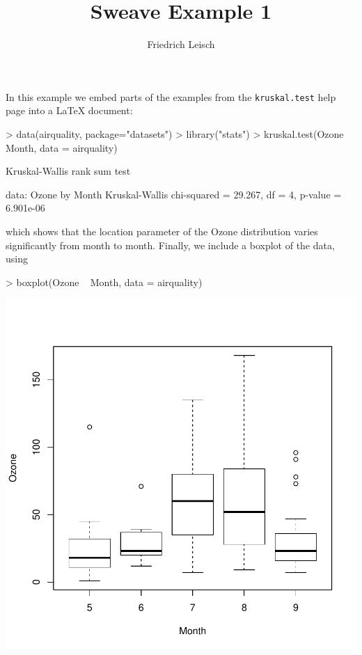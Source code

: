 \documentclass[a4paper]{article}
\title{Sweave Example 1}
\author{Friedrich Leisch}
\begin{document}
\maketitle

In this example we embed parts of the examples from the
\texttt{kruskal.test} help page into a \LaTeX{} document:

\begin{Schunk}
\begin{Sinput}
> data(airquality, package="datasets")
> library("stats")
> kruskal.test(Ozone ~ Month, data = airquality)
\end{Sinput}
\begin{Soutput}
	Kruskal-Wallis rank sum test

data:  Ozone by Month
Kruskal-Wallis chi-squared = 29.267, df = 4, p-value = 6.901e-06
\end{Soutput}
\end{Schunk}
which shows that the location parameter of the Ozone
distribution varies significantly from month to month. Finally, we
include a boxplot of the data, using
\begin{Schunk}
\begin{Sinput}
> boxplot(Ozone ~ Month, data = airquality)
\end{Sinput}
\end{Schunk}

\begin{center}
\includegraphics{example-1-003}
\end{center}
\end{document}
